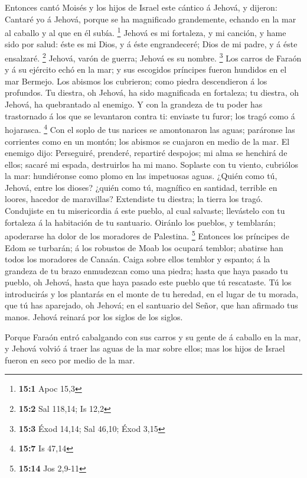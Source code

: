  Entonces cantó Moisés y los hijos de Israel este cántico á
Jehová, y dijeron: Cantaré yo á Jehová, porque se ha magnificado
grandemente, echando en la mar al caballo y al que en él subía.
\footnote{\textbf{15:1} Apoc 15,3}  Jehová es mi fortaleza,
y mi canción, y hame sido por salud: éste es mi Dios, y á éste
engrandeceré; Dios de mi padre, y á éste ensalzaré. \footnote{\textbf{15:2}
  Sal 118,14; Is 12,2}  Jehová, varón de guerra; Jehová es
su nombre. \footnote{\textbf{15:3} Éxod 14,14; Sal 46,10; Éxod 3,15}
 Los carros de Faraón y á su ejército echó en la mar; y sus
escogidos príncipes fueron hundidos en el mar Bermejo.  Los
abismos los cubrieron; como piedra descendieron á los profundos.
 Tu diestra, oh Jehová, ha sido magnificada en fortaleza; tu
diestra, oh Jehová, ha quebrantado al enemigo.  Y con la
grandeza de tu poder has trastornado á los que se levantaron contra ti:
enviaste tu furor; los tragó como á hojarasca. \footnote{\textbf{15:7}
  Is 47,14}  Con el soplo de tus narices se amontonaron las
aguas; paráronse las corrientes como en un montón; los abismos se
cuajaron en medio de la mar.  El enemigo dijo: Perseguiré,
prenderé, repartiré despojos; mi alma se henchirá de ellos; sacaré mi
espada, destruirlos ha mi mano.  Soplaste con tu viento,
cubriólos la mar: hundiéronse como plomo en las impetuosas aguas.
 ¿Quién como tú, Jehová, entre los dioses? ¿quién como tú,
magnífico en santidad, terrible en loores, hacedor de maravillas?
 Extendiste tu diestra; la tierra los tragó. 
Condujiste en tu misericordia á este pueblo, al cual salvaste;
llevástelo con tu fortaleza á la habitación de tu santuario.
 Oiránlo los pueblos, y temblarán; apoderarse ha dolor de
los moradores de Palestina. \footnote{\textbf{15:14} Jos 2,9-11}
 Entonces los príncipes de Edom se turbarán; á los robustos
de Moab los ocupará temblor; abatirse han todos los moradores de Canaán.
 Caiga sobre ellos temblor y espanto; á la grandeza de tu
brazo enmudezcan como una piedra; hasta que haya pasado tu pueblo, oh
Jehová, hasta que haya pasado este pueblo que tú rescataste.
 Tú los introducirás y los plantarás en el monte de tu
heredad, en el lugar de tu morada, que tú has aparejado, oh Jehová; en
el santuario del Señor, que han afirmado tus manos.  Jehová
reinará por los siglos de los siglos.

 Porque Faraón entró cabalgando con sus carros y su gente
de á caballo en la mar, y Jehová volvió á traer las aguas de la mar
sobre ellos; mas los hijos de Israel fueron en seco por medio de la mar.

